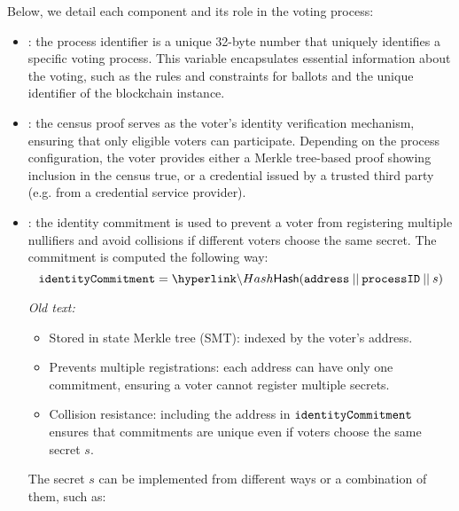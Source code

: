 Below, we detail each component and its role in the voting process:
\begin{itemize}
	\item \processid: the process identifier is a unique 32-byte number that uniquely identifies a specific voting process. This variable encapsulates essential information about the voting, such as the rules and constraints for ballots and the unique identifier of the \davinci blockchain instance.
	\item \censuspf: the census proof serves as the voter's identity verification mechanism, ensuring that only eligible voters can participate. Depending on the process configuration, the voter provides either a Merkle tree-based proof showing inclusion in the census true, or a credential issued by a trusted third party (e.g. from a credential service provider).
	\item \commitment: the identity commitment is used to prevent a voter from registering multiple nullifiers and avoid collisions if different voters choose the same secret. The commitment is computed the following way:
	\[ \commitment = \hlget{\Hash}(\address \conc \processid \conc s)\]
	{\it Old text:
	\begin{itemize}
		\item Stored in state Merkle tree (SMT): indexed by the voter's address.
		\item Prevents multiple registrations: each address can have only one commitment, ensuring a voter cannot register multiple secrets.
		\item Collision resistance: including the address in $\texttt{identityCommitment}$ ensures that commitments are unique even if voters choose the same secret $s$.
	\end{itemize}
	
	The secret $s$ can be implemented from different ways or a combination of them, such as:
	
}
\end{itemize}
